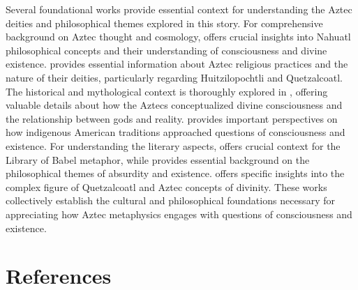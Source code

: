 \begin{refsection}
Several foundational works provide essential context for understanding the Aztec deities and philosophical themes explored in this story. For comprehensive background on Aztec thought and cosmology, \cite{leon-portilla1963aztec} offers crucial insights into Nahuatl philosophical concepts and their understanding of consciousness and divine existence. \cite{caso1958aztecs} provides essential information about Aztec religious practices and the nature of their deities, particularly regarding Huitzilopochtli and Quetzalcoatl. The historical and mythological context is thoroughly explored in \cite{sahagun1950florentine}, offering valuable details about how the Aztecs conceptualized divine consciousness and the relationship between gods and reality. \cite{brotherston1992book} provides important perspectives on how indigenous American traditions approached questions of consciousness and existence. For understanding the literary aspects, \cite{borges1964library} offers crucial context for the Library of Babel metaphor, while \cite{camus1955myth} provides essential background on the philosophical themes of absurdity and existence. \cite{carrasco1995quetzalcoatl} offers specific insights into the complex figure of Quetzalcoatl and Aztec concepts of divinity. These works collectively establish the cultural and philosophical foundations necessary for appreciating how Aztec metaphysics engages with questions of consciousness and existence.

\newpage
\section{References}
\printbibliography[title={},heading=subbibliography]
\end{refsection}